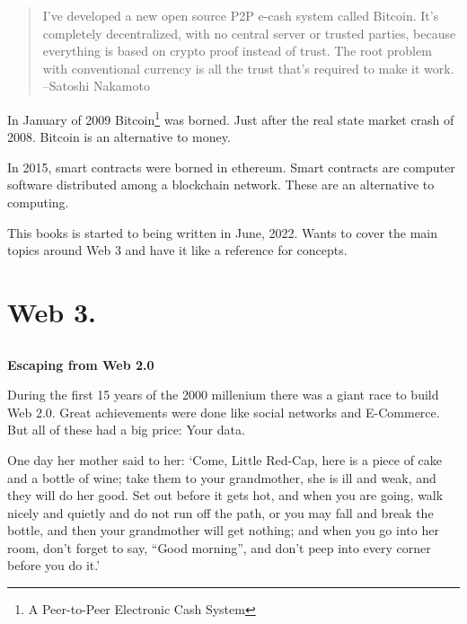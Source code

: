 \documentclass[oneside,11pt]{memoir} %
\begin{document}
\begin{quote}
I've developed a new open source P2P e-cash system called Bitcoin. It's completely decentralized, with no central server or trusted parties, because everything is based on crypto proof instead of trust. The root problem with conventional currency is all the trust that's required to make it work.\\
--Satoshi Nakamoto
\end{quote}

In January of 2009 Bitcoin\footnote{A Peer-to-Peer Electronic Cash System} was borned. Just after the real state market crash of 2008. Bitcoin is an alternative to money.

In 2015, smart contracts were borned in ethereum. Smart contracts are computer software distributed among a blockchain network. These are an alternative to computing.

This books is started to being written in June, 2022. Wants to cover the main topics around Web 3 and have it like a reference for concepts. 

\part{Web 3.}
\restoregeometry


\chapter{}\textbf{Escaping from Web 2.0}

During the first 15 years of the 2000 millenium there was a giant race to build Web 2.0. Great achievements were done like social networks and E-Commerce. But all of these had a big price: Your data.

One day her mother said to her: `Come, Little Red-Cap, here is a piece of cake and a bottle of wine; take them to your grandmother, she is ill and weak, and they will do her good. Set out before it gets hot, and when you are going, walk nicely and quietly and do not run off the path, or you may fall and break the bottle, and then your grandmother will get nothing; and when you go into her room, don't forget to say, ``Good morning'', and don't peep into every corner before you do it.'
\end{document}
